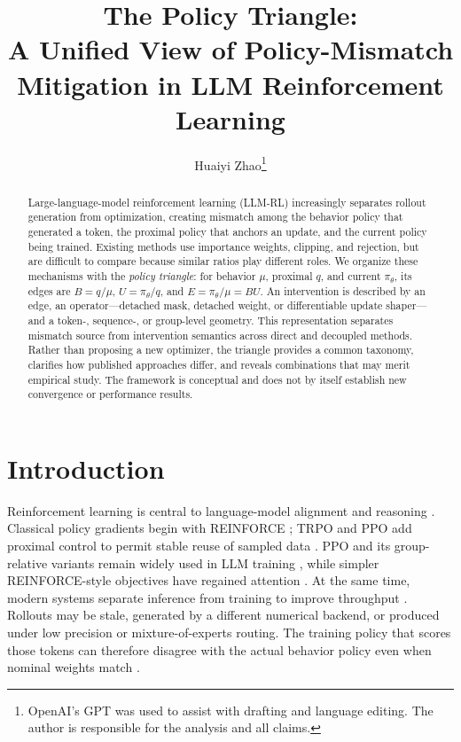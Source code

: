 \documentclass[10pt,twocolumn]{article}
\title{The Policy Triangle:\\
A Unified View of Policy-Mismatch Mitigation in LLM Reinforcement Learning}
\author{Huaiyi Zhao\thanks{OpenAI's GPT was used to assist with drafting and language editing. The author is responsible for the analysis and all claims.}}
\date{}
\newcommand{\beh}{\mu}
\newcommand{\prox}{q}
\newcommand{\cur}{\pi_\theta}
\newcommand{\B}{B}
\newcommand{\U}{U}
\newcommand{\E}{E}
\begin{document}
\maketitle

\begin{abstract}
Large-language-model reinforcement learning (LLM-RL) increasingly separates rollout generation from optimization, creating mismatch among the behavior policy that generated a token, the proximal policy that anchors an update, and the current policy being trained.  Existing methods use importance weights, clipping, and rejection, but are difficult to compare because similar ratios play different roles.  We organize these mechanisms with the \emph{policy triangle}: for behavior \(\beh\), proximal \(\prox\), and current \(\cur\), its edges are \(\B=\prox/\beh\), \(\U=\cur/\prox\), and \(\E=\cur/\beh=\B\U\).  An intervention is described by an edge, an operator---detached mask, detached weight, or differentiable update shaper---and a token-, sequence-, or group-level geometry.  This representation separates mismatch source from intervention semantics across direct and decoupled methods.  Rather than proposing a new optimizer, the triangle provides a common taxonomy, clarifies how published approaches differ, and reveals combinations that may merit empirical study.  The framework is conceptual and does not by itself establish new convergence or performance results.
\end{abstract}

\section{Introduction}

Reinforcement learning is central to language-model alignment and reasoning \citep{ziegler2019preferences,ouyang2022instructgpt,deepseek2025r1}.  Classical policy gradients begin with REINFORCE \citep{williams1992reinforce}; TRPO and PPO add proximal control to permit stable reuse of sampled data \citep{schulman2015trpo,schulman2017ppo}.  PPO and its group-relative variants remain widely used in LLM training \citep{shao2024deepseekmath,yu2025dapo}, while simpler REINFORCE-style objectives have regained attention \citep{li2023remax,ahmadian2024rloo,minimax2025m1,leroux2025topr}.  At the same time, modern systems separate inference from training to improve throughput \citep{sheng2024hybridflow,fu2025areal}.  Rollouts may be stale, generated by a different numerical backend, or produced under low precision or mixture-of-experts routing.  The training policy that scores those tokens can therefore disagree with the actual behavior policy even when nominal weights match \citep{lingteam2025ring1t,qiu2026fp8rl,zhong2026tim,li2025trm}.
\end{document}
